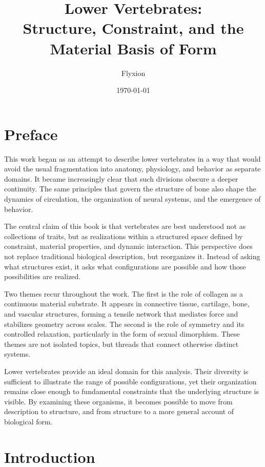 \documentclass[11pt,oneside]{book}
\begin{document}
\frontmatter

\title{Lower Vertebrates:\\
Structure, Constraint, and the Material Basis of Form}
\author{Flyxion}
\date{\today}
\maketitle

\chapter*{Preface}

This work began as an attempt to describe lower vertebrates in a way that would avoid the usual fragmentation into anatomy, physiology, and behavior as separate domains. It became increasingly clear that such divisions obscure a deeper continuity. The same principles that govern the structure of bone also shape the dynamics of circulation, the organization of neural systems, and the emergence of behavior.

The central claim of this book is that vertebrates are best understood not as collections of traits, but as realizations within a structured space defined by constraint, material properties, and dynamic interaction. This perspective does not replace traditional biological description, but reorganizes it. Instead of asking what structures exist, it asks what configurations are possible and how those possibilities are realized.

Two themes recur throughout the work. The first is the role of collagen as a continuous material substrate. It appears in connective tissue, cartilage, bone, and vascular structures, forming a tensile network that mediates force and stabilizes geometry across scales. The second is the role of symmetry and its controlled relaxation, particularly in the form of sexual dimorphism. These themes are not isolated topics, but threads that connect otherwise distinct systems.

Lower vertebrates provide an ideal domain for this analysis. Their diversity is sufficient to illustrate the range of possible configurations, yet their organization remains close enough to fundamental constraints that the underlying structure is visible. By examining these organisms, it becomes possible to move from description to structure, and from structure to a more general account of biological form.

\newpage
\chapter*{Introduction}
\end{document}
